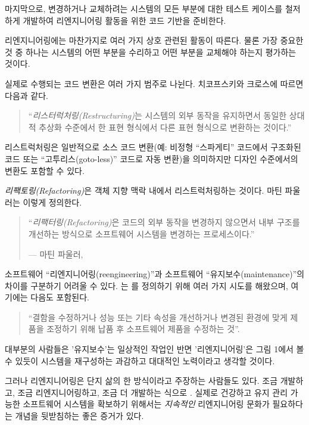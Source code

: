 \documentclass[a4paper,10pt,twoside]{book}
\begin{document}
마지막으로, 변경하거나 교체하려는 시스템의 모든 부분에 대한 테스트 케이스를 철저하게 개발하여 리엔지니어링 활동을 위한 코드 기반을 준비한다.

리엔지니어링에는 마찬가지로 여러 가지 상호 관련된 활동이 따른다. 물론 가장 중요한 것 중 하나는 시스템의 어떤 부분을 수리하고 어떤 부분을 교체해야 하는지 평가하는 것이다.

실제로 수행되는 코드 변환은 여러 가지 범주로 나뉜다. 치코프스키와 크로스에 따르면 다음과 같다.

\begin{quotation}
\noindent
``\emph{리스터럭처링(Restructuring)}는 시스템의 외부 동작을 유지하면서 동일한 상대적 추상화 수준에서 한 표현 형식에서 다른 표현 형식으로 변환하는 것이다.''
\end{quotation}

리스트럭처링은 일반적으로 소스 코드 변환(예: 비정형 ``스파게티'' 코드에서 구조화된 코드 또는 ``고투리스(goto-less)'' 코드로 자동 변환)을 의미하지만 디자인 수준에서의 변환도 포함할 수 있다. 

\emph{리팩토링(Refactoring)}은 객체 지향 맥락 내에서 리스트럭처링하는 것이다. 마틴 파울러는 이렇게 정의한다.

\begin{quotation}
\noindent
``\emph{리팩터링(Refactoring)}은 코드의 외부 동작을 변경하지 않으면서 내부 구조를 개선하는 방식으로 소프트웨어 시스템을 변경하는 프로세스이다.''

\hfill --- 마틴 파울러, \cite{Fowl99a}
\end{quotation}

소프트웨어 ``리엔지니어링(reengineering)''과 소프트웨어 ``유지보수(maintenance)''의 차이를 구분하기 어려울 수 있다. 는 를 정의하기 위해 여러 가지 시도를 해왔으며, 여기에는 다음도 포함된다.

\begin{quotation}
\noindent
``결함을 수정하거나 성능 또는 기타 속성을 개선하거나 변경된 환경에 맞게 제품을 조정하기 위해 납품 후 소프트웨어 제품을 수정하는 것''. 
\end{quotation}

대부분의 사람들은 '유지보수'는 일상적인 작업인 반면 '리엔지니어링'은 그림 1에서 볼 수 있듯이 시스템을 재구성하는 과감하고 대대적인 노력이라고 생각할 것이다.

그러나 리엔지니어링은 단지 삶의 한 방식이라고 주장하는 사람들도 있다. 조금 개발하고, 조금 리엔지니어링하고, 조금 더 개발하는 식으로 \cite{Beck00a}. 실제로 건강하고 유지 관리 가능한 소프트웨어 시스템을 확보하기 위해서는 \emph{지속적인} 리엔지니어링 문화가 필요하다는 개념을 뒷받침하는 좋은 증거가 있다.
\end{document}
